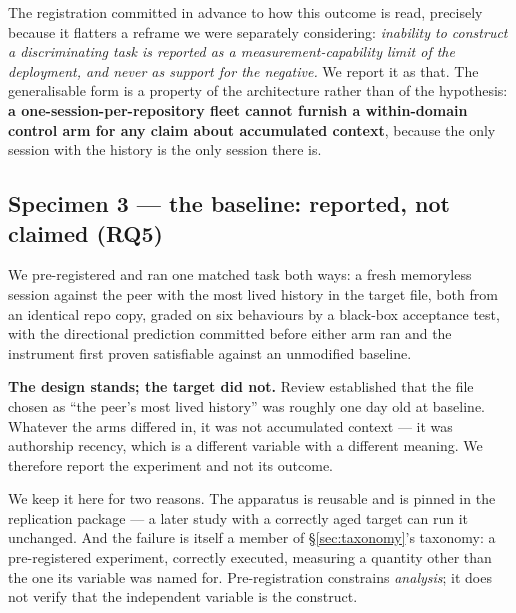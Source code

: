 \documentclass[10pt,conference]{IEEEtran}   %
\begin{document}
The registration committed in advance to how this outcome is read, precisely because it flatters a
reframe we were separately considering: \emph{inability to construct a discriminating task is
reported as a measurement-capability limit of the deployment, and never as support for the
negative.} We report it as that. The generalisable form is a property of the architecture rather
than of the hypothesis: \textbf{a one-session-per-repository fleet cannot furnish a within-domain
control arm for any claim about accumulated context}, because the only session with the history is
the only session there is.

\subsection{Specimen 3 --- the baseline: reported, not claimed (RQ5)}
\label{sec:rq5}
We pre-registered and ran one matched task both ways: a fresh memoryless session against the peer
with the most lived history in the target file, both from an identical repo copy, graded on six
behaviours by a black-box acceptance test, with the directional prediction committed before either
arm ran and the instrument first proven satisfiable against an unmodified baseline.

\textbf{The design stands; the target did not.} Review established that the file chosen as ``the
peer's most lived history'' was roughly one day old at baseline. Whatever the arms differed in, it
was not accumulated context --- it was authorship recency, which is a different variable with a
different meaning. We therefore report the experiment and not its outcome.

We keep it here for two reasons. The apparatus is reusable and is pinned in the replication package
--- a later study with a correctly aged target can run it unchanged. And the failure is itself a
member of \S\ref{sec:taxonomy}'s taxonomy: a pre-registered experiment, correctly executed, measuring a quantity
other than the one its variable was named for. Pre-registration constrains \emph{analysis}; it does
not verify that the independent variable is the construct.
\end{document}
